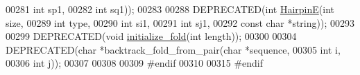 \begin{DoxyCode}
00281                           \textcolor{keywordtype}{int} sp1,
00282                           \textcolor{keywordtype}{int} sq1));
00283 
00288 DEPRECATED(\textcolor{keywordtype}{int} \hyperlink{group__mfe__fold__single_gab327ce11972f5ac069d52c8dedfdb700}{HairpinE}(\textcolor{keywordtype}{int} size,
00289                         \textcolor{keywordtype}{int} type,
00290                         \textcolor{keywordtype}{int} si1,
00291                         \textcolor{keywordtype}{int} sj1,
00292                         \textcolor{keyword}{const} \textcolor{keywordtype}{char} *\textcolor{keywordtype}{string}));
00293 
00299 DEPRECATED(\textcolor{keywordtype}{void} \hyperlink{group__mfe__fold__single_gac3f0a28d9cb609d388b155445073fd20}{initialize\_fold}(\textcolor{keywordtype}{int} length));
00300 
00304 DEPRECATED(\textcolor{keywordtype}{char} *backtrack\_fold\_from\_pair(\textcolor{keywordtype}{char} *sequence,
00305                                           \textcolor{keywordtype}{int} i,
00306                                           \textcolor{keywordtype}{int} j));
00307 
00308 
00309 \textcolor{preprocessor}{#endif}
00310 
00315 \textcolor{preprocessor}{#endif}
\end{DoxyCode}
